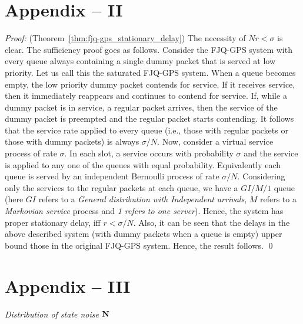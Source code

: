 \documentclass[acmtosn]{acmtrans2m}
\begin{document}
\section*{Appendix -- II}
\emph{Proof:} (Theorem~\ref{thm:fjq-gps_stationary_delay})
   The necessity of $Nr<\sigma$ is clear. The sufficiency
   proof goes as follows. Consider the FJQ-GPS system with every queue
   always containing a single dummy packet that is served at low
   priority. Let us call this the saturated
   FJQ-GPS system.  When a queue becomes empty, the low priority dummy
   packet contends for service. If it receives service, then it
   immediately reappears and continues to contend for service.  If,
   while a dummy packet is in service, a regular packet arrives, then
   the service of the dummy packet is preempted and the regular packet
   starts contending. It follows that the service rate applied to
   every queue (i.e., those with regular packets or those with dummy
   packets) is always $\sigma/N$. Now, consider a virtual service
   process of rate $\sigma$. In each slot, a service occurs with
   probability $\sigma$ and the service is applied to any one of the
   queues with equal probability.  Equivalently each queue is served
   by an independent Bernoulli process of rate $\sigma/N$.
   Considering only the services to the regular packets at each queue,
   we have a $GI/M/1$ queue (here $GI$ refers to a 
   {\em General distribution with Independent arrivals}, $M$ refers to 
   a {\em Markovian service} process and {\em 1 refers to one server}). 
   Hence, the system has proper stationary
   delay, iff $r < \sigma/N$. Also, it can be seen that the
   delays in the above described system (with dummy packets when a queue is empty) 
   upper bound those in the original
   FJQ-GPS system.  Hence, the result follows.
\qed

\section*{Appendix -- III}
\emph{Distribution of state noise ${\bf N}$}
\end{document}
